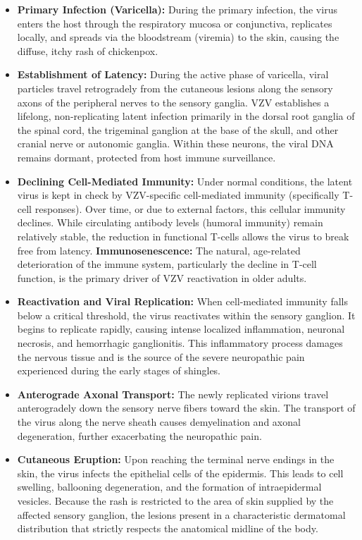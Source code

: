\begin{itemize}
    \item \textbf{Primary Infection (Varicella):} During the primary infection, the virus enters the host through the respiratory mucosa or conjunctiva, replicates locally, and spreads via the bloodstream (viremia) to the skin, causing the diffuse, itchy rash of chickenpox.
    \item \textbf{Establishment of Latency:} During the active phase of varicella, viral particles travel retrogradely from the cutaneous lesions along the sensory axons of the peripheral nerves to the sensory ganglia. VZV establishes a lifelong, non-replicating latent infection primarily in the dorsal root ganglia of the spinal cord, the trigeminal ganglion at the base of the skull, and other cranial nerve or autonomic ganglia. Within these neurons, the viral DNA remains dormant, protected from host immune surveillance.
    \item \textbf{Declining Cell-Mediated Immunity:} Under normal conditions, the latent virus is kept in check by VZV-specific cell-mediated immunity (specifically T-cell responses). Over time, or due to external factors, this cellular immunity declines. While circulating antibody levels (humoral immunity) remain relatively stable, the reduction in functional T-cells allows the virus to break free from latency.
    \textbf{Immunosenescence:} The natural, age-related deterioration of the immune system, particularly the decline in T-cell function, is the primary driver of VZV reactivation in older adults.
    \item \textbf{Reactivation and Viral Replication:} When cell-mediated immunity falls below a critical threshold, the virus reactivates within the sensory ganglion. It begins to replicate rapidly, causing intense localized inflammation, neuronal necrosis, and hemorrhagic ganglionitis. This inflammatory process damages the nervous tissue and is the source of the severe neuropathic pain experienced during the early stages of shingles.
    \item \textbf{Anterograde Axonal Transport:} The newly replicated virions travel anterogradely down the sensory nerve fibers toward the skin. The transport of the virus along the nerve sheath causes demyelination and axonal degeneration, further exacerbating the neuropathic pain.
    \item \textbf{Cutaneous Eruption:} Upon reaching the terminal nerve endings in the skin, the virus infects the epithelial cells of the epidermis. This leads to cell swelling, ballooning degeneration, and the formation of intraepidermal vesicles. Because the rash is restricted to the area of skin supplied by the affected sensory ganglion, the lesions present in a characteristic dermatomal distribution that strictly respects the anatomical midline of the body.
\end{itemize}

